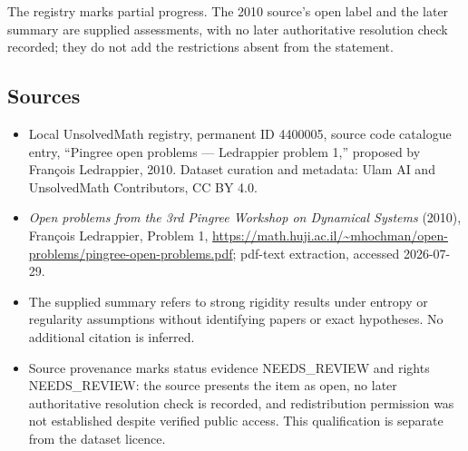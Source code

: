 \documentclass[11pt]{article}
\begin{document}
The registry marks partial progress. The 2010 source's open label and the later summary are supplied assessments, with no later authoritative resolution check recorded; they do not add the restrictions absent from the statement.
\subsection{Sources}
\begin{itemize}
\item Local UnsolvedMath registry, permanent ID 4400005, source code catalogue entry, ``Pingree open problems --- Ledrappier problem 1,'' proposed by François Ledrappier, 2010. Dataset curation and metadata: Ulam AI and UnsolvedMath Contributors, CC BY 4.0.
\item \emph{Open problems from the 3rd Pingree Workshop on Dynamical Systems} (2010), François Ledrappier, Problem 1, \url{https://math.huji.ac.il/~mhochman/open-problems/pingree-open-problems.pdf}; pdf-text extraction, accessed 2026-07-29.
\item The supplied summary refers to strong rigidity results under entropy or regularity assumptions without identifying papers or exact hypotheses. No additional citation is inferred.
\item Source provenance marks status evidence NEEDS\_REVIEW and rights NEEDS\_REVIEW: the source presents the item as open, no later authoritative resolution check is recorded, and redistribution permission was not established despite verified public access. This qualification is separate from the dataset licence.
\end{itemize}
\end{document}
